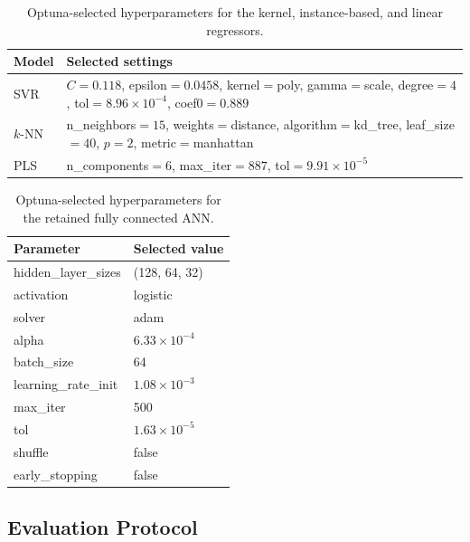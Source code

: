 \documentclass[a4paper,fleqn]{cas-sc}
\newenvironment{revblock}{}{}
\newenvironment{revblockr24}{}{}
\newenvironment{revblockr25}{}{}
\begin{document}
\begin{revblock}
\begin{revblockr24}
\begin{table}[H]
\centering
\caption{Optuna-selected hyperparameters for the kernel, instance-based, and linear regressors.}
\label{tab:optuna_classical_b}
\scriptsize
\begin{tabular}{>{\raggedright\arraybackslash}p{2.1cm}>{\raggedright\arraybackslash}p{9.0cm}}
\hline
Model & Selected settings \\
\hline
SVR & $C=0.118$, epsilon$=0.0458$, kernel$=$poly, gamma$=$scale, degree$=4$, tol$=8.96 \times 10^{-4}$, coef0$=0.889$ \\
$k$-NN & n\_neighbors$=15$, weights$=$distance, algorithm$=$kd\_tree, leaf\_size$=40$, $p=2$, metric$=$manhattan \\
PLS & n\_components$=6$, max\_iter$=887$, tol$=9.91 \times 10^{-5}$ \\
\hline
\end{tabular}
\end{table}

\begin{table}[H]
\centering
\caption{Optuna-selected hyperparameters for the retained fully connected ANN.}
\label{tab:optuna_mlp}
\scriptsize
\begin{tabular}{ll}
\hline
Parameter & Selected value \\
\hline
hidden\_layer\_sizes & (128, 64, 32) \\
activation & logistic \\
solver & adam \\
alpha & $6.33 \times 10^{-4}$ \\
batch\_size & 64 \\
learning\_rate\_init & $1.08 \times 10^{-3}$ \\
max\_iter & 500 \\
tol & $1.63 \times 10^{-5}$ \\
shuffle & false \\
early\_stopping & false \\
\hline
\end{tabular}
\end{table}
\end{revblockr24}

\begin{revblockr25}
\subsection{Evaluation Protocol}


\end{revblockr25}
\end{revblock}
\end{document}
